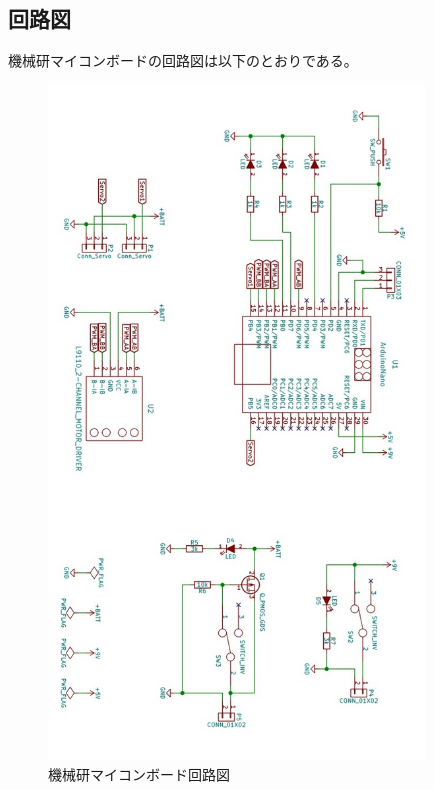 \documentclass[uplatex]{jsarticle}
\begin{document}
\subsection{回路図}
機械研マイコンボードの回路図は以下のとおりである。
\begin{figure}
    \centering
    \includegraphics[width=10cm]{circuit.jpg}
    \caption{機械研マイコンボード回路図}
\end{figure}
\end{document}
